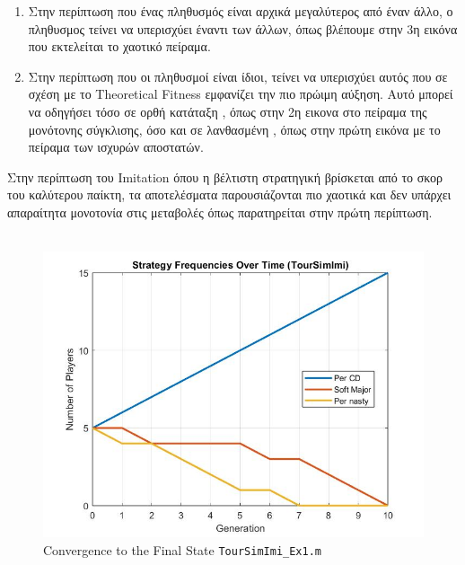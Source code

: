 \begin{enumerate}
\item  Στην περίπτωση που ένας πληθυσμός είναι αρχικά μεγαλύτερος από έναν άλλο, ο πληθυσμος τείνει να υπερισχύει έναντι των άλλων, όπως βλέπουμε στην 3η εικόνα που εκτελείται το χαοτικό πείραμα.

\item  Στην περίπτωση που οι πληθυσμοί είναι ίδιοι, τείνει να υπερισχύει αυτός που σε σχέση με το Theoretical Fitness εμφανίζει την πιο πρώιμη αύξηση. Αυτό μπορεί να οδηγήσει τόσο σε ορθή κατάταξη , όπως στην 2η εικονα στο πείραμα της μονότονης σύγκλισης, όσο και σε λανθασμένη , όπως στην πρώτη εικόνα με το πείραμα των ισχυρών αποστατών.


\end{enumerate}
Στην περίπτωση του Imitation όπου η βέλτιστη στρατηγική βρίσκεται από το σκορ του καλύτερου παίκτη, τα αποτελέσματα παρουσιάζονται πιο χαοτικά και δεν υπάρχει απαραίτητα μονοτονία στις μεταβολές όπως παρατηρείται στην πρώτη περίπτωση.\\
\\
\begin{figure}[!th]
	\centering
	\includegraphics[width=0.7\linewidth]{toursimimi1}
	\caption{Convergence to the Final State \texttt{TourSimImi\_Ex1.m}}
	\label{fig:toursimimi1}
\end{figure}
